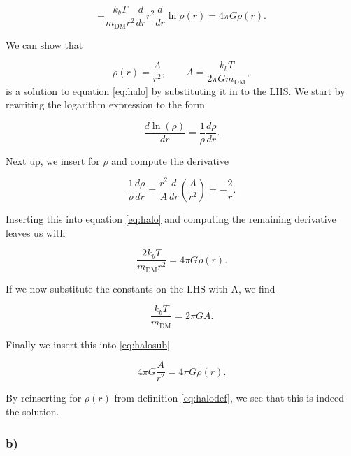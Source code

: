 \documentclass[a4paper]{article}
\begin{document}
\begin{equation}\label{eq:halo}
    -\frac{k_b T}{m_{\text{DM}}r^2} \frac{d}{dr} r^2 \frac{d}{dr} \ln{\rho(r)} = 4\pi G
    \rho(r).
\end{equation}

\noindent We can show that

\begin{equation}\label{eq:halodef}
    \rho(r) = \frac{A}{r^2}, \qquad A = \frac{k_bT}{2\pi G m_{\text{DM}}},
\end{equation}
is a solution to equation \eqref{eq:halo} by substituting it in to the LHS.
We start by rewriting the logarithm expression to the form

\begin{equation*}
    \frac{d \ln(\rho)}{dr} = \frac{1}{\rho} \frac{d \rho}{dr}.
\end{equation*}

\noindent Next up, we insert for $\rho$ and compute the derivative

\begin{equation*}
    \frac{1}{\rho} \frac{d \rho}{dr} = \frac{r^2}{A} \frac{d}{dr} \left( \frac{A}{r^2}
    \right) = -\frac{2}{r}. 
\end{equation*}

\noindent Inserting this into equation \eqref{eq:halo} and computing the remaining
derivative
leaves us with

\begin{equation}\label{eq:halosub}
    \frac{2k_b T}{m_{\text{DM}}r^2} = 4\pi G \rho(r).
\end{equation}

\noindent If we now substitute the constants on the LHS with A, we find

\begin{equation*}
    \frac{k_b T}{m_\text{DM}} = 2\pi G A.
\end{equation*}

\noindent Finally we insert this into \eqref{eq:halosub}

\begin{equation*}
    4\pi G \frac{A}{r^2} = 4\pi G \rho(r).
\end{equation*}

\noindent By reinserting for $\rho(r)$ from definition \eqref{eq:halodef}, we see that
this is
indeed the solution.

\subsubsection*{b)}
\end{document}
